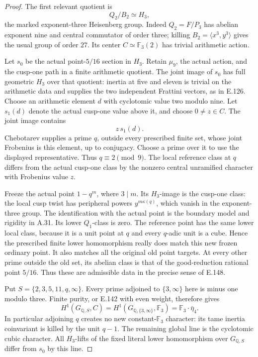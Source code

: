 \begin{proof}
The first relevant quotient is
\[
                  Q_2/B_2\simeq H_3,
 \tag{E.149.1}
\]
the marked exponent-three Heisenberg
group. Indeed \(Q_2=F/P_3\) has
abelian exponent nine and central
commutator of order three; killing
\(B_2=\langle x^3,y^3\rangle\)
gives the usual group of order \(27\).
Its center \(C\simeq\mathbb F_3(2)\)
has trivial arithmetic action.

Let \(s_0\) be the actual point-\(5/16\)
section in \(H_3\). Retain \(\mu_9\),
the actual action, and the cusp-one
path in a finite arithmetic quotient.
The joint image of \(s_0\) has full
geometric \(H_3\) over that quotient:
inertia at five and eleven is trivial
on the arithmetic data and supplies
the two independent Frattini vectors,
as in E.126.
Choose an arithmetic element \(d\)
with cyclotomic value two modulo nine.
Let \(s_1(d)\) denote the actual
cusp-one value above it, and choose
\(0\ne z\in C\).
The joint image contains
\[
                             z\,s_1(d).
 \tag{E.149.2}
\]
Chebotarev supplies a prime \(q\),
outside every prescribed finite set,
whose joint Frobenius is this element,
up to conjugacy.
Choose a prime over it to use the
displayed representative. Thus
\(q\equiv2\pmod9\).
The local reference class at \(q\)
differs from the actual cusp-one
class by the nonzero central
unramified character with Frobenius
value \(z\).

Freeze the actual point \(1-q^m\),
where \(3\mid m\).
Its \(H_3\)-image is the cusp-one
class: the local cusp twist has
peripheral powers \(y^{m\kappa(q)}\),
which vanish in the exponent-three
group. The identification with the
actual point is the boundary model
and rigidity in A.31.
Its lower \(Q_1\)-class is zero.
The reference point has the same
lower local class, because it is
a unit point at \(q\) and every
\(q\)-adic unit is a cube.
Hence the prescribed finite lower
homomorphism really does match this
new frozen ordinary point.
It also matches all the original
old point targets.
At every other prime outside the
old set, its abelian class is that
of the good-reduction rational
point \(5/16\).
Thus these are admissible data in
the precise sense of E.148.

Put \(S=\{2,3,5,11,q,\infty\}\).
Every prime adjoined to
\(\{3,\infty\}\) here is minus one
modulo three. Finite purity, or
E.142 with even weight, therefore
gives
\[
 H^1(G_{\mathbb Q,S},C)
   =H^1(G_{\mathbb Q,\{3,\infty\}},\mathbb F_3)
   =\mathbb F_3\cdot\bar\eta_4.
 \tag{E.149.3}
\]
In particular adjoining \(q\)
creates no new constant-\(\mathbb F_3\)
character: its tame inertia coinvariant
is killed by the unit \(q-1\).
The remaining global line is the
cyclotomic cubic character.
All \(H_3\)-lifts of the fixed
literal lower homomorphism over
\(G_{\mathbb Q,S}\) differ from \(s_0\)
by this line.


\end{proof}
